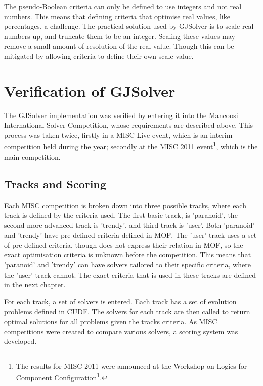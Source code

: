 The pseudo-Boolean criteria can only be defined to use integers and not real numbers.
This means that defining criteria that optimise real values, like percentages, a challenge.
The practical solution used by GJSolver is to scale real numbers up, and truncate them to be an integer.
Scaling these values may remove a small amount of resolution of the real value.
Though this can be mitigated by allowing criteria to define their own scale value.

\section{Verification of GJSolver}
\label{impl.verif}
The GJSolver implementation was verified by entering it into the Mancoosi International Solver Competition, whose requirements are described above.
This process was taken twice, firstly in a MISC Live event, which is an interim competition held during the year;
secondly at the MISC 2011 event\footnote{The results for MISC 2011 were announced at the Workshop on Logics for Component Configuration\footnote{http://www.pps.jussieu.fr/~treinen/lococo/2011/ accessed 6/3/2012}.}, 
which is the main competition. 

\subsection{Tracks and Scoring}
Each MISC competition is broken down into three possible tracks, where each track is defined by the criteria used.
The first basic track, is 'paranoid', the second more advanced track is 'trendy', and third track is 'user'.
Both 'paranoid' and 'trendy' have pre-defined criteria defined in MOF.
The 'user' track uses a set of pre-defined criteria, though does not express their relation in MOF, so the exact optimisation criteria is unknown before the competition.
This means that 'paranoid' and 'trendy' can have solvers tailored to their specific criteria, where the 'user' track cannot.
The exact criteria that is used in these tracks are defined in the next chapter.

For each track, a set of solvers is entered.
Each track has a set of evolution problems defined in CUDF.
The solvers for each track are then called to return optimal solutions for all problems given the tracks criteria.
As MISC competitions were created to compare various solvers, a scoring system was developed. 

